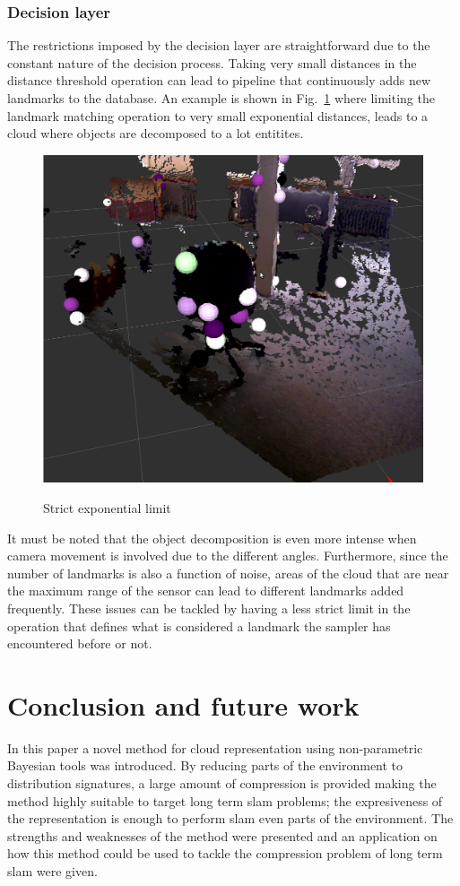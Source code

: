 \documentclass[]{article}
\begin{document}
\subsubsection{Decision layer}

    The restrictions imposed by the decision layer are straightforward due to the constant nature of the decision process. Taking very small distances in the distance threshold operation can lead to pipeline that continuously adds new landmarks to the database. An example is shown in Fig.~\ref{pip:expo} where limiting the landmark matching operation to very small exponential distances, leads to a cloud where objects are decomposed to a lot entitites.

    \begin{figure}
        \includegraphics[width=.4\textwidth]{monsterchair} \\
        \caption{Strict exponential limit}
        \label{pip:expo}
    \end{figure}

    It must be noted that the object decomposition is even more intense when camera movement is involved due to the different angles. Furthermore, since the number of landmarks is also a function of noise, areas of the cloud that are near the maximum range of the sensor can lead to different landmarks added frequently. These issues can be tackled by having a less strict limit in the operation that defines what is considered a landmark the sampler has encountered before or not.



    \section{Conclusion and future work}
    \label{sec:discussion}

    In this paper a novel method for cloud representation using non-parametric Bayesian tools was introduced. By reducing parts of the environment to distribution signatures, a large amount of compression is provided making the method highly suitable to target long term slam problems; the expresiveness of the representation is enough to perform slam even parts of the environment. The strengths and weaknesses of the method were presented and an application on how this method could be used to tackle the compression problem of long term slam were given.
\end{document}
